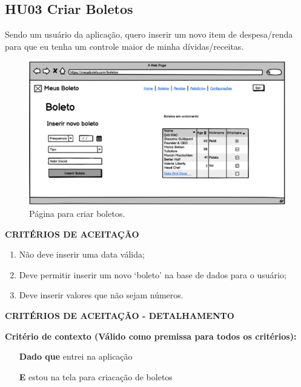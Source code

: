 \subsection{HU03 Criar Boletos}

Sendo um usuário da aplicação, quero inserir um novo item de despesa/renda para que eu tenha um controle maior de minha dívidas/receitas.

\begin{figure}[h]
	\caption{\label{fig:hu03}Página para criar boletos.}
	\begin{center}
		\includegraphics[scale=0.5]{images/CriarBoletoRenda.png}
	\end{center}
\end{figure}


\textbf{CRITÉRIOS DE ACEITAÇÃO}

\begin{enumerate}
    \item Não deve inserir uma data válida;
    \item Deve permitir inserir um novo ‘boleto’ na base de dados para o
usuário;
    \item Deve inserir valores que não sejam números.
\end{enumerate}

\textbf{CRITÉRIOS DE ACEITAÇÃO - DETALHAMENTO}

\textbf{Critério de contexto (Válido como premissa para todos os critérios):}

\begin{itemize}
    \item[\textbf{Dado que}] entrei na aplicação
    \item[\textbf{E}] estou na tela para criacação de boletos
\end{itemize}


